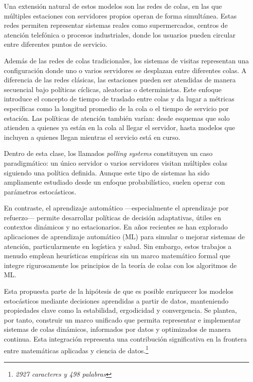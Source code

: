 \documentclass[12pt]{article}
\begin{document}
Una extensión natural de estos modelos son las redes de colas, en las que múltiples estaciones con servidores propios operan de forma simultánea. Estas redes permiten representar sistemas reales como supermercados, centros de atención telefónica o procesos industriales, donde los usuarios pueden circular entre diferentes puntos de servicio.

Además de las redes de colas tradicionales, los sistemas de visitas representan una configuración donde uno o varios servidores se desplazan entre diferentes colas. A diferencia de las redes clásicas, las estaciones pueden ser atendidas de manera secuencial bajo políticas cíclicas, aleatorias o deterministas. Este enfoque introduce el concepto de tiempo de traslado entre colas y da lugar a métricas específicas como la longitud promedio de la cola o el tiempo de servicio por estación. Las políticas de atención también varían: desde esquemas que solo atienden a quienes ya están en la cola al llegar el servidor, hasta modelos que incluyen a quienes llegan mientras el servicio está en curso.

Dentro de esta clase, los llamados \textit{polling systems} constituyen un caso paradigmático: un único servidor o varios servidores visitan múltiples colas siguiendo una política definida. Aunque este tipo de sistemas ha sido ampliamente estudiado desde un enfoque probabilístico, suelen operar con parámetros estocásticos.

En contraste, el aprendizaje automático —especialmente el aprendizaje por refuerzo— permite desarrollar políticas de decisión adaptativas, útiles en contextos dinámicos y no estacionarios. En años recientes se han explorado aplicaciones de aprendizaje automático (ML) para simular o mejorar sistemas de atención, particularmente en logística y salud. Sin embargo, estos trabajos a menudo emplean heurísticas empíricas sin un marco matemático formal que integre rigurosamente los principios de la teoría de colas con los algoritmos de ML.

Esta propuesta parte de la hipótesis de que es posible enriquecer los modelos estocásticos mediante decisiones aprendidas a partir de datos, manteniendo propiedades clave como la estabilidad, ergodicidad y convergencia. Se plantea, por tanto, construir un marco unificado que permita representar e implementar sistemas de colas dinámicos, informados por datos y optimizados de manera continua. Esta integración representa una contribución significativa en la frontera entre matemáticas aplicadas y ciencia de datos.\footnote{\textit{2927 caracteres y 498 palabras}}
\end{document}
